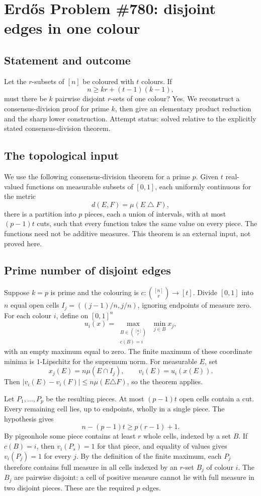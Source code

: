 \section*{Erd\H{o}s Problem \#780: disjoint edges in one colour}
\subsection*{Statement and outcome}
Let the \(r\)-subsets of \([n]\) be coloured with \(t\) colours. If
\[
n\geq kr+(t-1)(k-1),
\]
must there be \(k\) pairwise disjoint \(r\)-sets of one colour?
Yes. We reconstruct a consensus-division proof for prime \(k\), then give an elementary product reduction and the sharp lower construction. Attempt status: solved relative to the explicitly stated consensus-division theorem.

\subsection*{The topological input}
We use the following consensus-division theorem for a prime \(p\). Given \(t\) real-valued functions on measurable subsets of \([0,1]\), each uniformly continuous for the metric
\[
d(E,F)=\mu(E\mathbin{\triangle}F),
\]
there is a partition into \(p\) pieces, each a union of intervals, with at most \((p-1)t\) cuts, such that every function takes the same value on every piece. The functions need not be additive measures. This theorem is an external input, not proved here.

\subsection*{Prime number of disjoint edges}
Suppose \(k=p\) is prime and the colouring is \(c:\binom{[n]}r\to[t]\). Divide \([0,1]\) into \(n\) equal open cells \(I_j=((j-1)/n,j/n)\), ignoring endpoints of measure zero. For each colour \(i\), define on \([0,1]^n\)
\[
u_i(x)=\max_{\substack{B\in\binom{[n]}r\\c(B)=i}}\ \min_{j\in B}x_j,
\]
with an empty maximum equal to zero. The finite maximum of these coordinate minima is \(1\)-Lipschitz for the supremum norm. For measurable \(E\), set
\[
x_j(E)=n\mu(E\cap I_j),\qquad v_i(E)=u_i(x(E)).
\]
Then \(|v_i(E)-v_i(F)|\leq n\mu(E\triangle F)\), so the theorem applies.

Let \(P_1,\ldots,P_p\) be the resulting pieces. At most \((p-1)t\) open cells contain a cut. Every remaining cell lies, up to endpoints, wholly in a single piece. The hypothesis gives
\[
n-(p-1)t\geq p(r-1)+1.
\]
By pigeonhole some piece contains at least \(r\) whole cells, indexed by a set \(B\). If \(c(B)=i\), then \(v_i(P_s)=1\) for that piece, and equality of values gives \(v_i(P_j)=1\) for every \(j\). By the definition of the finite maximum, each \(P_j\) therefore contains full measure in all cells indexed by an \(r\)-set \(B_j\) of colour \(i\).
The \(B_j\) are pairwise disjoint: a cell of positive measure cannot lie with full measure in two disjoint pieces. These are the required \(p\) edges.


